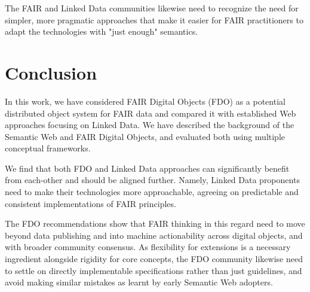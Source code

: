 \documentclass[fleqn,10pt,lineno]{wlpeerjlua}
\begin{document}
The FAIR and Linked Data communities likewise need to recognize the need for simpler, more pragmatic approaches that make it easier for FAIR practitioners to adapt the technologies with "just enough" semantics. 




\section*{Conclusion}\label{conclusion}

In this work, we have considered FAIR Digital Objects (FDO) as a potential distributed object system for FAIR data and compared it with established Web approaches focusing on Linked Data. We have described the background of the Semantic Web and FAIR Digital Objects, and evaluated both using multiple conceptual frameworks.

We find that both FDO and Linked Data approaches can significantly benefit from each-other and should be aligned further. Namely, Linked Data proponents need to make their technologies more approachable, agreeing on predictable and consistent implementations of FAIR principles. 

The FDO recommendations show that FAIR thinking in this regard need to move beyond data publishing and into machine actionability across digital objects, and with broader community consensus. 
As flexibility for extensions is a necessary ingredient alongside rigidity for core concepts, the FDO community likewise need to settle on directly implementable specifications rather than just guidelines, and avoid making similar mistakes as learnt by early Semantic Web adopters. 
\end{document}

